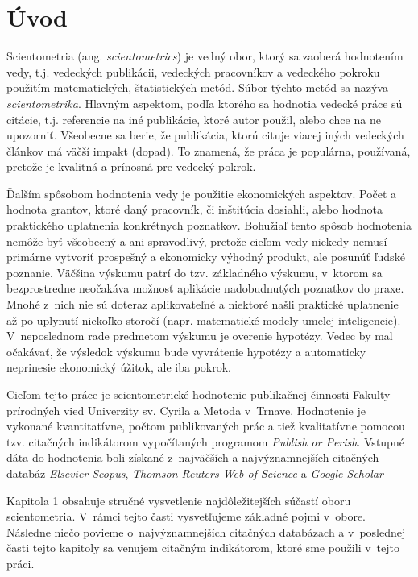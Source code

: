 \chapter*{Úvod}

Scientometria (ang. \emph{scientometrics}) je vedný obor, ktorý sa zaoberá
hodnotením vedy, t.j. vedeckých publikácii, vedeckých pracovníkov a vedeckého
pokroku použitím matematických, štatistických metód.  Súbor týchto metód sa
nazýva \emph{scientometrika}.  Hlavným aspektom, podľa ktorého sa hodnotia
vedecké práce sú citácie, t.j. referencie na iné publikácie, ktoré autor
použil, alebo chce na ne upozorniť.  Všeobecne sa berie, že publikácia, ktorú
cituje viacej iných vedeckých článkov má väčší impakt (dopad).  To znamená, že
práca je populárna, používaná, pretože je kvalitná a prínosná pre vedecký
pokrok.

Ďalším spôsobom hodnotenia vedy je použitie ekonomických aspektov.  Počet a
hodnota grantov, ktoré daný pracovník, či inštitúcia dosiahli, alebo hodnota
praktického uplatnenia konkrétnych poznatkov.  Bohužiaľ tento spôsob hodnotenia
nemôže byť všeobecný a ani spravodlivý, pretože cieľom vedy niekedy nemusí
primárne vytvoriť prospešný a ekonomicky výhodný produkt, ale posunúť ľudské
poznanie.  Väčšina výskumu patrí do tzv.  základného výskumu, v~ktorom sa
bezprostredne neočakáva možnosť aplikácie nadobudnutých poznatkov do praxe.
Mnohé z~nich nie sú doteraz aplikovateľné a niektoré našli praktické uplatnenie
až po uplynutí niekoľko storočí (napr. matematické modely umelej inteligencie).
V~neposlednom rade predmetom výskumu je overenie hypotézy.  Vedec by mal
očakávať, že výsledok výskumu bude vyvrátenie hypotézy a automaticky neprinesie
ekonomický úžitok, ale iba pokrok.

Cieľom tejto práce je scientometrické hodnotenie publikačnej činnosti Fakulty
prírodných vied Univerzity sv. Cyrila a Metoda v~Trnave.  Hodnotenie je
vykonané kvantitatívne, počtom publikovaných prác a tiež kvalitatívne pomocou
tzv. citačných indikátorom vypočítaných programom \emph{Publish or Perish}.
Vstupné dáta do hodnotenia boli získané z~najväčších a najvýznamnejších
citačných databáz \emph{Elsevier Scopus}, \emph{Thomson Reuters Web of Science}
a \emph{Google Scholar}

Kapitola 1 obsahuje stručné vysvetlenie najdôležitejších súčastí oboru
 scientometria. V~rámci tejto časti vysvetľujeme základné pojmi v~obore.
Následne niečo povieme o~najvýznamnejších citačných databázach a v~poslednej
časti tejto kapitoly sa venujem citačným indikátorom, ktoré sme použili
v~tejto práci.

